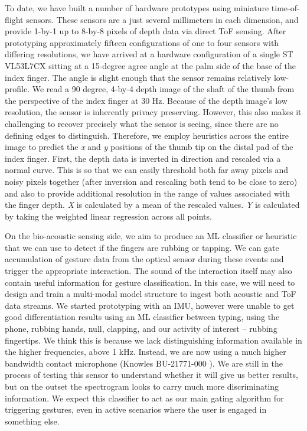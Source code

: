 \documentclass [11pt, proquest] {uwthesis}[2020/02/24]
\begin{document}
To date, we have built a number of hardware prototypes using  miniature time-of-flight sensors. These sensors are a just several millimeters in each dimension, and provide 1-by-1 up to 8-by-8 pixels of depth data via direct ToF sensing.
After prototyping approximately fifteen configurations of one to four sensors with differing resolutions, we have arrived at a hardware configuration of a single ST VL53L7CX \cite{VL53L7CX} sitting at a 15-degree agree angle at the palm side of the base of the index finger. The angle is slight enough that the sensor remains relatively low-profile. We read a 90 degree, 4-by-4 depth image of the shaft of the thumb from the perspective of the index finger at 30 Hz. Because of the depth image's low resolution, the sensor is inherently privacy preserving. However, this also makes it challenging to recover precisely what the sensor is seeing, since there are no defining edges to distinguish. Therefore, we employ heuristics across the entire image to predict the \textit{x} and \textit{y} positions of the thumb tip on the distal pad of the index finger. First, the depth data is inverted in direction and rescaled via a normal curve. This is so that we can easily threshold both far away pixels and noisy pixels together (after inversion and rescaling both tend to be close to zero) and also to provide additional resolution in the range of values associated with the finger depth. \textit{X} is calculated by a mean of the rescaled values. \textit{Y} is calculated by taking the weighted linear regression across all points. 

On the bio-acoustic sensing side, we aim to produce an ML classifier or heuristic that we can use to detect if the fingers are rubbing or tapping. We can gate accumulation of gesture data from the optical sensor during these events and trigger the appropriate interaction. The sound of the interaction itself may also contain useful information for gesture classification. In this case, we will need to design and train a multi-modal model structure to ingest both acoustic and ToF data streams. We started prototyping with an IMU, however were unable to get good differentiation results using an ML classifier between typing, using the phone, rubbing hands, null, clapping, and our activity of interest -- rubbing fingertips. We think this is because we lack distinguishing information available in the higher frequencies, above 1 kHz. Instead, we are now using a much higher bandwidth contact microphone (Knowles BU-21771-000 \cite{knowles}). We are still in the process of testing this sensor to understand whether it will give us better results, but on the outset the spectrogram looks to carry much more discriminating information. We expect this classifier to act as our main gating algorithm for triggering gestures, even in active scenarios where the user is engaged in something else.
\end{document}
